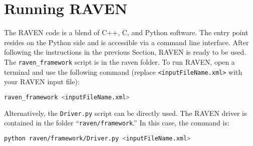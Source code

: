 \section{Running RAVEN}
\label{HowToRun}

The RAVEN code is a blend of C++, C, and Python software. The entry point
resides on the Python side and is accessible via a command line interface.
%
After following the instructions in the previous Section, RAVEN is ready to be
used.
%
The \texttt{raven\_framework} script is in the raven folder.
%
To run RAVEN, open a terminal and use the following command (replace \texttt{<inputFileName.xml>} with your RAVEN input file):

\begin{lstlisting}[language=bash]
raven_framework <inputFileName.xml>
\end{lstlisting}

Alternatively, the \texttt{Driver.py} script can be directly used.  The RAVEN driver is contained in the folder ``\texttt{raven/framework}.'' In this case, the command is:

\begin{lstlisting}[language=bash]
python raven/framework/Driver.py <inputFileName.xml>
\end{lstlisting}

